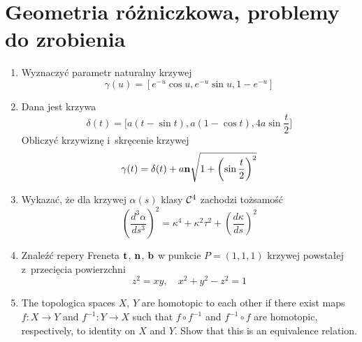 \documentclass[a4paper,11pt]{article}
\begin{document}
\section{Geometria różniczkowa, problemy do zrobienia}





\begin{enumerate}
\item Wyznaczyć parametr naturalny krzywej
  \begin{equation}
    \label{DiffGeo:01}
    \gamma( u ) = \left[ e^{ -u } \cos u, e^{ -u } \sin u, 1 - e^{ -u } \right]
  \end{equation}

\item Dana jest krzywa
  \begin{equation}
    \label{DiffGeo:02}
    \delta( t ) =
    \big[ a ( t - \sin t ), a ( 1 - \cos t ), 4a \sin \frac{ t }{ 2 } \big]
  \end{equation}
  Obliczyć krzywiznę i~skręcenie krzywej
  \begin{equation}
    \label{DiffGeo:03}
    \gamma( t ) =
    \delta( t )
    + a \mathbf{n} \sqrt{ 1 + \left( \sin \frac{ t }{ 2 } \right)^{ 2 } }
  \end{equation}

\item Wykazać, że dla krzywej $\alpha( s )$ klasy $\mathcal{C}^{ 4 }$ zachodzi
  tożsamość
  \begin{equation}
    \label{DiffGeo:04}
    \left( \frac{ d^{ 3 } \alpha }{ d s^{ 3 } } \right)^{ 2 }
    =
    \kappa^{ 4 } + \kappa^{ 2 } \tau^{ 2 } + \left( \frac{ d \kappa }{ d s } \right)^{ 2 }
  \end{equation}

\item Znaleźć repery Freneta $\mathbf{t}$, $\mathbf{n}$, $\mathbf{b}$ w
  punkcie $P = (1, 1, 1)$ krzywej powstałej z~przecięcia powierzchni
  \begin{equation}
    \label{DiffGeo:05}
    z^{ 2 } = xy, \quad
    x^{ 2 } + y^{ 2 } - z^{ 2 } = 1
  \end{equation}

\item The topologica spaces $X$, $Y$ are homotopic to each other if
  there exist maps $f : X \to Y$ and $f^{ -1 } : Y \to X$ such that
  $f \circ f^{ -1 }$ and $f^{ -1 } \circ f$ are homotopic,
  respectively, to identity on $X$ and $Y$. Show that this is an
  equivalence relation.


\end{enumerate}
\end{document}
